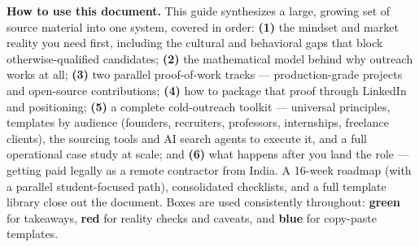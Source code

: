 \begingroup
\begin{tcolorbox}[colback=lightbg,colframe=inkblue!40,boxrule=0.6pt,arc=2pt,left=10pt,right=10pt,top=8pt,bottom=8pt]
\small
\textbf{How to use this document.} This guide synthesizes a large, growing set of source material into one
system, covered in order: \textbf{(1)} the mindset and market reality you need first, including the cultural and
behavioral gaps that block otherwise-qualified candidates; \textbf{(2)} the mathematical model behind why
outreach works at all; \textbf{(3)} two parallel proof-of-work tracks --- production-grade projects and
open-source contributions; \textbf{(4)} how to package that proof through LinkedIn and positioning; \textbf{(5)}
a complete cold-outreach toolkit --- universal principles, templates by audience (founders, recruiters,
professors, internships, freelance clients), the sourcing tools and AI search agents to execute it, and a full
operational case study at scale; and \textbf{(6)} what happens after you land the role --- getting paid legally
as a remote contractor from India. A 16-week roadmap (with a parallel student-focused path), consolidated
checklists, and a full template library close out the document. Boxes are used consistently throughout:
\textcolor{goodline}{\textbf{green}} for takeaways, \textcolor{warnline}{\textbf{red}} for reality checks and
caveats, and \textcolor{tmplline}{\textbf{blue}} for copy-paste templates.
\end{tcolorbox}
\endgroup
